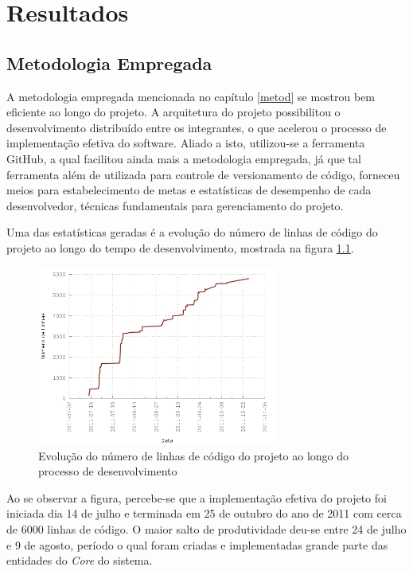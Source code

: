 \chapter{Resultados}
\label{chap:result}

\section{Metodologia Empregada}

A metodologia empregada mencionada no capítulo \ref{metod} se mostrou bem eficiente ao longo do projeto.
A arquitetura do projeto possibilitou o desenvolvimento distribuído entre os integrantes, o que acelerou o processo de implementação efetiva do software.
Aliado a isto, utilizou-se a ferramenta GitHub, a qual facilitou ainda mais a metodologia empregada, já que tal ferramenta além de utilizada para controle de versionamento de código, forneceu meios para estabelecimento de metas e estatísticas de desempenho de cada desenvolvedor, técnicas fundamentais para gerenciamento do projeto.

Uma das estatísticas geradas é a evolução do número de linhas de código do projeto ao longo do tempo de desenvolvimento, mostrada na figura \ref{fig:linesofcode}.

\begin{figure}[!htb]
	\centering
	\includegraphics[width=0.7\textwidth]{./plots/lines_of_code.png}
	\caption[Evolução do número de linhas de código do projeto]{Evolução do número de linhas de código do projeto ao longo do processo de desenvolvimento}
	\label{fig:linesofcode}
\end{figure}

Ao se observar a figura, percebe-se que a implementação efetiva do projeto foi iniciada dia 14 de julho e terminada em 25 de outubro do ano de 2011 com cerca de 6000 linhas de código. O maior salto de produtividade deu-se entre 24 de julho e 9 de agosto, período o qual foram criadas e implementadas grande parte das entidades do \emph{Core} do sistema. 

